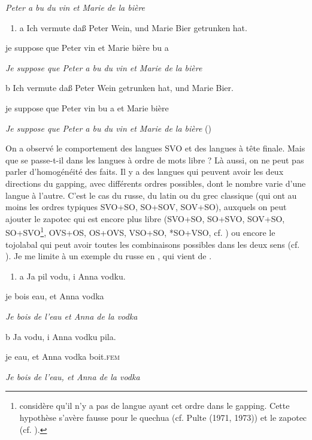 {\itshape
Peter a bu du vin et Marie de la bière}


\begin{enumerate}
\item a  Ich  vermute  da{\ss}  Peter  Wein,  und  Marie  Bier  getrunken  hat.


\end{enumerate}
je  suppose  que  Peter  vin  et  Marie  bière  bu  a

{\itshape
  Je suppose que Peter a bu du vin et Marie de la bière     } 

  b  Ich  vermute  da{\ss}  Peter  Wein  getrunken  hat,  und  Marie  Bier.

je  suppose  que  Peter  vin  bu  a  et  Marie  bière

\textit{Je suppose que Peter a bu du vin et Marie de la bière}      (\citet[192]{Crysmann2006})

On a observé le comportement des langues SVO et des langues à tête finale. Mais que se passe-t-il dans les langues à ordre de mots libre ? Là aussi, on ne peut pas parler d'homogénéité des faits. Il y a des langues qui peuvent avoir les deux directions du gapping, avec différents ordres possibles, dont le nombre varie d'une langue à l'autre. C'est le cas du russe, du latin ou du grec classique (qui ont au moins les ordres typiques SVO+SO, SO+SOV, SOV+SO), auxquels on peut ajouter le zapotec qui est encore plus libre (SVO+SO, SO+SVO, SOV+SO, SO+SVO\footnote{\citet{Ross1970} considère qu'il n'y a pas de langue ayant cet ordre dans le gapping. Cette hypothèse s'avère fausse pour le quechua (cf. Pulte (1971, 1973)) et le zapotec (cf. \citet{Rosenbaum1977}).}, OVS+OS, OS+OVS, VSO+SO, *SO+VSO, cf. \citet{Rosenbaum1977}) ou encore le tojolabal qui peut avoir toutes les combinaisons possibles dans les deux sens (cf. \citet{Furbee1974}). Je me limite à un exemple du russe en , qui vient de \citet{Ross1970}.


\begin{enumerate}
\item \label{bkm:Ref287463623}a  Ja pil vodu, i Anna vodku.


\end{enumerate}
je bois eau, et Anna vodka

{\itshape
Je bois de l'eau et Anna de la vodka}

 b  Ja vodu, i Anna vodku pila.

je eau, et Anna vodka boit.\textsc{fem}

{\itshape
Je bois de l'eau, et Anna de la vodka}

